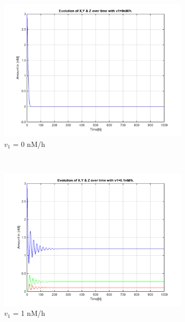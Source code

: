 \documentclass[10pt,a4paper,oneside,twocolumn]{article}
\numberwithin{equation}{section} %
\begin{document}
    \begin{figure}
    \centering
	\begin{subfigure}[b]{0.32\textwidth}
	    \includegraphics[width=\textwidth]{LotsofthesameA/A-A0.png}
	    \caption{$v_1$ = 0 nM/h}
	    \end{subfigure}
	    ~ 
	    \begin{subfigure}[b]{0.32\textwidth}
	    \includegraphics[width=\textwidth]{LotsofthesameA/A-A1.png}
	    \caption{$v_1$ = 1 nM/h}
	    \end{subfigure}
	    ~ 
	\begin{subfigure}[b]{0.32\textwidth}

\end{subfigure}
\end{figure}
\end{document}
